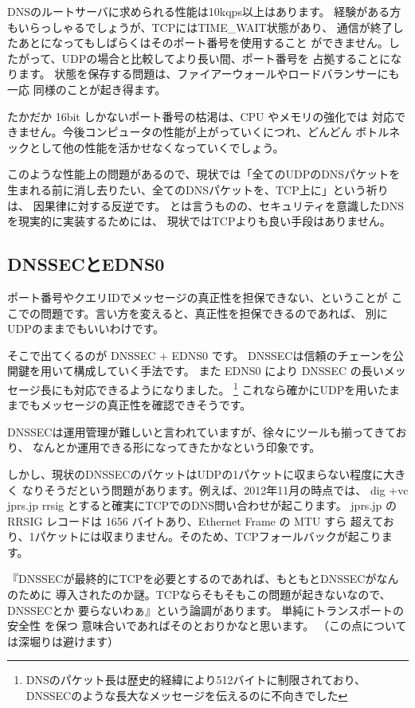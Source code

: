 DNSのルートサーバに求められる性能は10kqps以上はあります。
経験がある方もいらっしゃるでしょうが、TCPにはTIME\_WAIT状態があり、
通信が終了したあとになってもしばらくはそのポート番号を使用すること
ができません。したがって、UDPの場合と比較してより長い間、ポート番号を
占拠することになります。
状態を保存する問題は、ファイアーウォールやロードバランサーにも一応
同様のことが起き得ます。

たかだか 16bit しかないポート番号の枯渇は、CPU やメモリの強化では
対応できません。今後コンピュータの性能が上がっていくにつれ、どんどん
ボトルネックとして他の性能を活かせなくなっていくでしょう。

このような性能上の問題があるので、現状では「全てのUDPのDNSパケットを
生まれる前に消し去りたい、全てのDNSパケットを、TCP上に」という祈りは、
因果律に対する反逆です。
とは言うものの、セキュリティを意識したDNSを現実的に実装するためには、
現状ではTCPよりも良い手段はありません。

\subsection{DNSSECとEDNS0}
ポート番号やクエリIDでメッセージの真正性を担保できない、ということが
ここでの問題です。言い方を変えると、真正性を担保できるのであれば、
別にUDPのままでもいいわけです。

そこで出てくるのが DNSSEC + EDNS0 です。
DNSSECは信頼のチェーンを公開鍵を用いて構成していく手法です。
また EDNS0 により DNSSEC の長いメッセージ長にも対応できるようになりました。
\footnote{DNSのパケット長は歴史的経緯により512バイトに制限されており、
DNSSECのような長大なメッセージを伝えるのに不向きでした}
これなら確かにUDPを用いたままでもメッセージの真正性を確認できそうです。

DNSSECは運用管理が難しいと言われていますが、徐々にツールも揃ってきており、
なんとか運用できる形になってきたかなという印象です。

しかし、現状のDNSSECのパケットはUDPの1パケットに収まらない程度に大きく
なりそうだという問題があります。例えば、2012年11月の時点では、 dig +vc jprs.jp rrsig 
とすると確実にTCPでのDNS問い合わせが起こります。
jprs.jp の RRSIG レコードは 1656 バイトあり、Ethernet Frame の MTU すら
超えており、1パケットには収まりません。そのため、TCPフォールバックが起こります。

『DNSSECが最終的にTCPを必要とするのであれば、もともとDNSSECがなんのために
導入されたのか謎。TCPならそもそもこの問題が起きないなので、 DNSSECとか
要らないわぁ』という論調があります。 単純にトランスポートの安全性 を保つ
意味合いであればそのとおりかなと思います。
（この点については深堀りは避けます）

